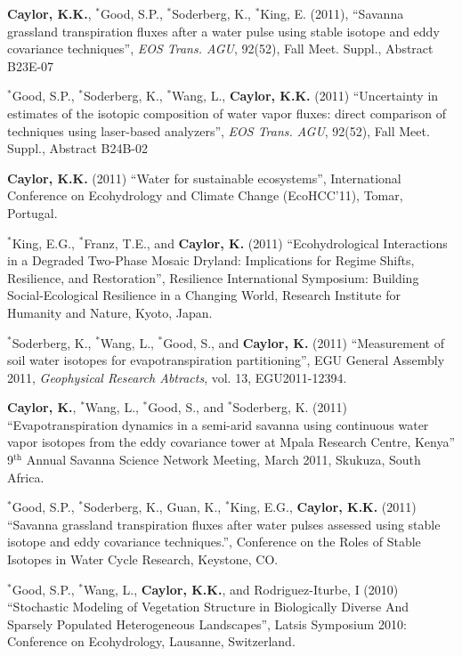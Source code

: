 \documentclass[10pt]{report}
\begin{document}
\begin{etaremune}
\item \textbf{Caylor, K.K.},  $^{*}$Good, S.P.,  $^{*}$Soderberg, K.,  $^{*}$King, E. (2011), ``Savanna grassland transpiration fluxes after a water pulse using stable isotope and eddy covariance techniques'', \emph{EOS Trans. AGU}, 92(52), Fall Meet. Suppl., Abstract B23E-07

\item  $^{*}$Good, S.P., $^{*}$Soderberg, K., $^{*}$Wang, L., \textbf{Caylor, K.K.} (2011) ``Uncertainty in estimates of the isotopic composition of water vapor fluxes: direct comparison of techniques using laser-based analyzers'', \emph{EOS Trans. AGU}, 92(52), Fall Meet. Suppl., Abstract B24B-02 

\item \textbf{Caylor, K.K.} (2011) ``Water for sustainable ecosystems'', International Conference on Ecohydrology and Climate Change (EcoHCC'11), Tomar, Portugal.

\item $^{*}$King, E.G., $^{*}$Franz, T.E., and \textbf{Caylor, K.} (2011) ``Ecohydrological Interactions in a Degraded Two-Phase Mosaic Dryland: Implications for Regime Shifts, Resilience, and Restoration'', Resilience International Symposium: Building Social-Ecological Resilience in a Changing World, Research Institute for Humanity and Nature, Kyoto, Japan.

\item $^{*}$Soderberg, K., $^{*}$Wang, L., $^{*}$Good, S., and \textbf{Caylor, K.} (2011) ``Measurement of soil water isotopes for evapotranspiration partitioning'',  EGU General Assembly 2011, \emph{Geophysical Research Abtracts}, vol. 13, EGU2011-12394.

\item \textbf{Caylor, K.}, $^{*}$Wang, L., $^{*}$Good, S., and $^{*}$Soderberg, K. (2011) ``Evapotranspiration dynamics in a semi-arid savanna using continuous water vapor isotopes from the eddy covariance tower at Mpala Research Centre, Kenya''  9$^{\mbox{th}}$ Annual Savanna Science Network Meeting, March 2011, Skukuza, South Africa.

\item $^{*}$Good, S.P., $^{*}$Soderberg, K., Guan, K., $^{*}$King, E.G., \textbf{Caylor, K.K.} (2011) ``Savanna grassland transpiration fluxes after water pulses assessed using stable isotope and eddy covariance techniques.'', Conference on the Roles of Stable Isotopes in Water Cycle Research, Keystone, CO.

\item $^{*}$Good, S.P., $^{*}$Wang, L.,  \textbf{Caylor, K.K.}, and Rodriguez-Iturbe, I (2010) ``Stochastic Modeling of Vegetation Structure in Biologically Diverse And Sparsely Populated Heterogeneous Landscapes'', Latsis Symposium 2010: Conference on Ecohydrology, Lausanne, Switzerland.


\end{etaremune}
\end{document}
